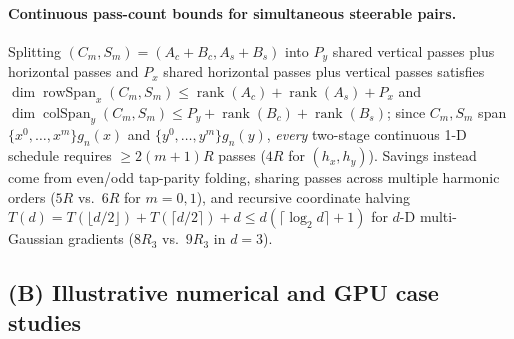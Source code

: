 \documentclass[11pt,a4paper]{article}
\theoremstyle{plain}
\theoremstyle{definition}
\begin{document}
\paragraph{Continuous pass-count bounds for simultaneous steerable pairs.}
Splitting $(C_m, S_m) = (A_c + B_c, A_s + B_s)$ into $P_y$ shared vertical passes plus horizontal passes and $P_x$ shared horizontal passes plus vertical passes satisfies $\dim\operatorname{rowSpan}_x(C_m, S_m) \le \operatorname{rank}(A_c) + \operatorname{rank}(A_s) + P_x$ and $\dim\operatorname{colSpan}_y(C_m, S_m) \le P_y + \operatorname{rank}(B_c) + \operatorname{rank}(B_s)$; since $C_m, S_m$ span $\{x^0,\dots,x^m\}g_n(x)$ and $\{y^0,\dots,y^m\}g_n(y)$, \emph{every} two-stage continuous 1-D schedule requires $\ge 2(m + 1)R$ passes ($4R$ for $(h_x, h_y)$). Savings instead come from even/odd tap-parity folding, sharing passes across multiple harmonic orders ($5R$ vs.\ $6R$ for $m = 0, 1$), and recursive coordinate halving $T(d) = T(\lfloor d/2\rfloor) + T(\lceil d/2\rceil) + d \le d(\lceil\log_2 d\rceil + 1)$ for $d$-D multi-Gaussian gradients ($8R_3$ vs.\ $9R_3$ in $d = 3$).

\subsection{(B) Illustrative numerical and GPU case studies}\label{sec:case_studies}
\end{document}
